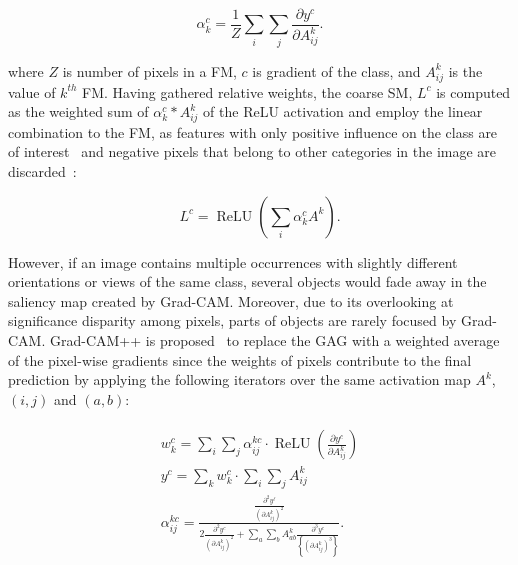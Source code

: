 \vspace{-4mm}
\begin{equation}
    \alpha_k^c=\frac{1}{Z}\sum_{i}\sum_{j}\frac{\partial y^c}{\partial A_{ij}^k}.
    \label{eq:alpha}
\end{equation}
\vspace{-4mm}

where $Z$ is number of pixels in a FM, $c$ is gradient of the class, and $A_{ij}^k$ is the value of $k^{th}$ FM. Having gathered relative weights, the coarse SM, $L^c$ is computed as the weighted sum of $\alpha_k^c*A_{ij}^k$ of the ReLU activation and employ the linear combination to the FM, as features with only positive influence on the class are of interest~\cite{chattopadhay2018grad} and negative pixels that belong to other categories in the image are discarded~\cite{114}:

\vspace{-4mm}
\begin{equation}
    L^c=\operatorname{ReLU}(\sum_{i}\alpha_k^cA^k).
    \label{3.11}
\end{equation}
\vspace{-4mm}

\hspace*{3.5mm} However, if an image contains multiple occurrences with slightly different orientations or views of the same class, several objects would fade away in the saliency map created by Grad-CAM. Moreover, due to its overlooking at significance disparity among pixels, parts of objects are rarely focused by Grad-CAM. Grad-CAM++ is proposed~\cite{chattopadhay2018grad} to replace the GAG with a weighted average of the pixel-wise gradients since the weights of pixels contribute to the final prediction by applying the following iterators over the same activation map $A^k$, $(i,j)$ and $(a,b)$:

\vspace{-4mm}
\begin{align}
    \begin{aligned}
        w_{k}^{c}=\sum_{i} \sum_{j} \alpha_{i j}^{k c} \cdot \operatorname{ReLU}\left(\frac{\partial y^{c}}{\partial A_{i j}^{k}}\right) \\
        y^{c}=\sum_{k} w_{k}^{c} \cdot \sum_{i} \sum_{j} A_{i j}^{k} \\
        \alpha_{i j}^{k c}=\frac{\frac{\partial^{2} y^{\ell}}{\left(\partial A_{i j}^{k}\right)^{2}}}{2 \frac{\partial^{2} y^{c}}{\left(\partial A_{i j}^{k}\right)^{2}}+\sum_{a} \sum_{b} A_{a b}^{k} \frac{\partial^{3} y^{c}}{\left\{\left(\partial A_{i j}^{k}\right)^{3}\right\}}}.
    \end{aligned}
\end{align}

